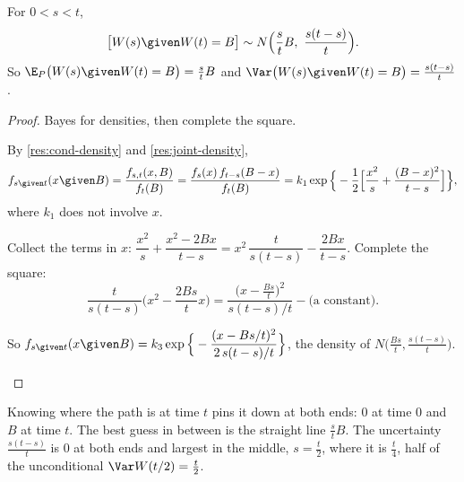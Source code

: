 \begin{theorem}[$W(s)$ given $W(t)=B$, for $s<t$]
\label{thm:bridge-law}
For $0<s<t$,
\[
  \big[W(s)\given W(t)=B\big]\sim N\Big(\frac stB,\ \frac{s(t-s)}{t}\Big).
\]
So $\E_P\big(W(s)\given W(t)=B\big)=\frac stB$ and $\Var\big(W(s)\given W(t)=B\big)=\frac{s(t-s)}{t}$.
\end{theorem}
\begin{proof}
Bayes for densities, then complete the square.
\begin{steps}
  \item By \cref{res:cond-density} and \cref{res:joint-density},
  \[
    f_{s\given t}(x\given B)=\frac{f_{s,t}(x,B)}{f_t(B)}=\frac{f_s(x)\,f_{t-s}(B-x)}{f_t(B)}
    =k_1\exp\Big\{-\frac12\Big[\frac{x^2}{s}+\frac{(B-x)^2}{t-s}\Big]\Big\},
  \]
  where $k_1$ does not involve $x$.
  \item Collect the terms in $x$: $\dfrac{x^2}{s}+\dfrac{x^2-2Bx}{t-s}=x^2\,\dfrac{t}{s(t-s)}-\dfrac{2Bx}{t-s}$. Complete the square:
  \[
    \frac{t}{s(t-s)}\Big(x^2-\frac{2Bs}{t}x\Big)=\frac{\big(x-\frac{Bs}{t}\big)^2}{s(t-s)/t}-\text{(a constant)}.
  \]
  \item So $f_{s\given t}(x\given B)=k_3\exp\Big\{-\dfrac{(x-Bs/t)^2}{2\,s(t-s)/t}\Big\}$, the density of $N\big(\frac{Bs}{t},\frac{s(t-s)}{t}\big)$. \qedhere
\end{steps}
\end{proof}

\begin{intuition}
Knowing where the path is at time $t$ pins it down at both ends: $0$ at time $0$ and $B$ at time $t$. The best guess in between is the straight line $\frac stB$. The uncertainty $\frac{s(t-s)}{t}$ is $0$ at both ends and largest in the middle, $s=\frac t2$, where it is $\frac t4$, half of the unconditional $\Var W(t/2)=\frac t2$.
\end{intuition}

\begin{pic}
\end{pic}


